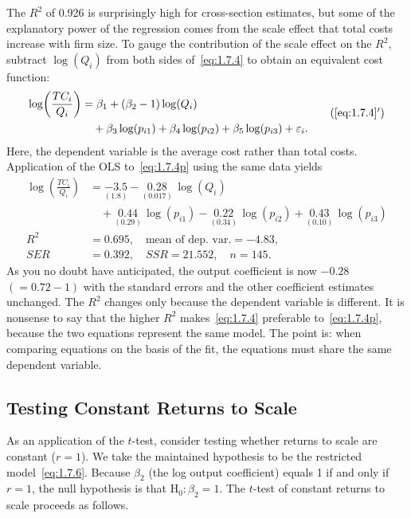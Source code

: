 The $R^2$ of 0.926 is surprisingly high for cross-section estimates, but some of the
explanatory power of the regression comes from the scale effect that total costs increase
with firm size.  To gauge the contribution of the scale effect on the $R^2$, subtract
$\log(Q_i)$ from both sides of~\eqref{eq:1.7.4} to obtain an equivalent cost function:
\begin{equation}
\begin{aligned}
  \log\!\left(\frac{TC_i}{Q_i}\right)
  &= \beta_1 + (\beta_2 - 1)\log(Q_i) \\
  &\quad + \beta_3\log(p_{i1}) + \beta_4\log(p_{i2})
    + \beta_5\log(p_{i3}) + \varepsilon_i.
\end{aligned}
\tag{\ref{eq:1.7.4}$'$}
\label{eq:1.7.4p}
\end{equation}
Here, the dependent variable is the average cost rather than total costs.  Application of
the OLS to~\eqref{eq:1.7.4p} using the same data yields
\begin{equation}
\begin{aligned}
  \log\!\left(\frac{TC_i}{Q_i}\right)
  &= \underset{(1.8)}{-3.5} - \underset{(0.017)}{0.28}\,\log(Q_i) \\
  &\quad + \underset{(0.29)}{0.44}\,\log(p_{i1})
    - \underset{(0.34)}{0.22}\,\log(p_{i2})
    + \underset{(0.10)}{0.43}\,\log(p_{i3}) \\[6pt]
  R^2 &= 0.695,\quad \text{mean of dep.\ var.} = -4.83, \\
  SER &= 0.392,\quad SSR = 21.552,\quad n = 145.
\end{aligned}
\label{eq:1.7.9}
\end{equation}
As you no doubt have anticipated, the output coefficient is now $-0.28$ $(= 0.72 - 1)$
with the standard errors and the other coefficient estimates unchanged.  The $R^2$
changes only because the dependent variable is different.  It is nonsense to say that the
higher $R^2$ makes~\eqref{eq:1.7.4} preferable to~\eqref{eq:1.7.4p}, because the two
equations represent the same model.  The point is: when comparing equations on the basis
of the fit, the equations must share the same dependent variable.

\subsection*{Testing Constant Returns to Scale}

As an application of the $t$-test, consider testing whether returns to scale are constant
($r = 1$).  We take the maintained hypothesis to be the restricted model~\eqref{eq:1.7.6}.
Because $\beta_2$ (the log output coefficient) equals 1 if and only if $r = 1$, the null
hypothesis is that $\text{H}_0\colon \beta_2 = 1$.  The $t$-test of constant returns to
scale proceeds as follows.

